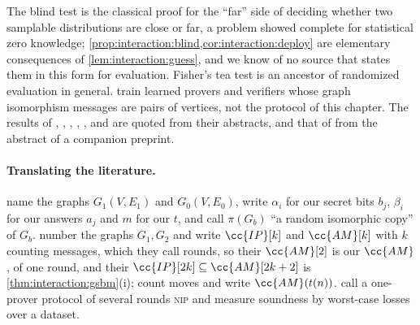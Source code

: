 \begin{refsection}
The blind test is the classical proof for the ``far'' side of deciding whether two samplable distributions are close or far, a problem \textcite{SahaiVadhan2003} showed complete for statistical zero knowledge; \cref{prop:interaction:blind,cor:interaction:deploy} are elementary consequences of \cref{lem:interaction:guess}, and we know of no source that states them in this form for evaluation. Fisher's tea test \parencite{Fisher1935} is an ancestor of randomized evaluation in general. \Textcite{HammondAdamDay2025} train learned provers and verifiers whose graph isomorphism messages are pairs of vertices, not the protocol of this chapter. The results of \textcite{GolchinSurdeanu2024}, \textcite{SainzEtAl2023}, \textcite{ZhangEtAl2024GSM1k}, \textcite{NeedhamEtAl2025}, \textcite{GreenblattEtAl2024Faking}, \textcite{KlivansVanMelkebeek2002} and \textcite{Babai2016} are quoted from their abstracts, and that of \textcite{DworkEtAl2015} from the abstract of a companion preprint.

\paragraph{Translating the literature.} \Textcite{GoldreichMicaliWigderson1991} name the graphs $G_1(V,E_1)$ and $G_0(V,E_0)$, write $\alpha_i$ for our secret bits $b_j$, $\beta_i$ for our answers $a_j$ and $m$ for our $t$, and call $\pi(G_b)$ ``a random isomorphic copy'' of $G_b$. \Textcite{AroraBarak2009} number the graphs $G_1,G_2$ and write $\cc{IP}[k]$ and $\cc{AM}[k]$ with $k$ counting messages, which they call rounds, so their $\cc{AM}[2]$ is our $\cc{AM}$, of one round, and their $\cc{IP}[2k]\subseteq\cc{AM}[2k+2]$ is \cref{thm:interaction:gsbm}(i); \textcite{BabaiMoran1988} count moves and write $\cc{AM}(t(n))$. \Textcite{HammondAdamDay2025} call a one-prover protocol of several rounds \textsc{nip} and measure soundness by worst-case losses over a dataset.

\printchapterbib
\end{refsection}
